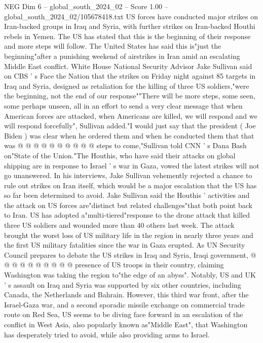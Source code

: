 \begin{textsample}{NEG Dim 6 – global\_south\_2024\_02 – Score 1.00 – global\_south\_2024\_02/105678418.txt}  \label{ex:f6_neg_284}
US forces have conducted major strikes on Iran-backed groups in Iraq and Syria, with further strikes on Iran-backed Houthi rebels in Yemen.
The US has stated that this is the beginning of their response and more steps will follow.
The United States has said this is"just the beginning"after a punishing weekend of airstrikes in Iran amid an escalating Middle East conflict.
White House National Security Advisor Jake Sullivan said on CBS ' s Face the Nation that the strikes on Friday night against 85 targets in Iraq and Syria, designed as retaliation for the killing of three US soldiers,"were the beginning, not the end of our response""There will be more steps, some seen, some perhaps unseen, all in an effort to send a very clear message that when American forces are attacked, when Americans are killed, we will respond and we will respond forcefully", Sullivan added."I would just say that the president ( Joe Biden ) was clear when he ordered them and when he conducted them that that was @ @ @ @ @ @ @ @ @ @ steps to come,"Sullivan told CNN ' s Dana Bash on"State of the Union."The Houthis, who have said their attacks on global shipping are in response to Israel ' s war in Gaza, vowed the latest strikes will not go unanswered.
In his interviews, Jake Sullivan vehemently rejected a chance to rule out strikes on Iran itself, which would be a major escalation that the US has so far been determined to avoid.
Jake Sullivan said the Houthis ' activities and the attack on US forces are"distinct but related challenges"that both point back to Iran.
US has adopted a"multi-tiered"response to the drone attack that killed three US soldiers and wounded more than 40 others last week.
The attack brought the worst loss of US military life in the region in nearly three years and the first US military fatalities since the war in Gaza erupted.
As UN Security Council prepares to debate the US strikes in Iraq and Syria, Iraqi government, @ @ @ @ @ @ @ @ @ @ presence of US troops in their country, claiming Washington was taking the region to"the edge of an abyss".
Notably, US and UK ' s assault on Iraq and Syria was supported by six other countries, including Canada, the Netherlands and Bahrain.
However, this third war front, after the Israel-Gaza war, and a second sporadic missile exchange on commercial trade route on Red Sea, US seems to be diving face forward in an escalation of the conflict in West Asia, also popularly known as"Middle East", that Washington has desperately tried to avoid, while also providing arms to Israel.

\end{textsample}

